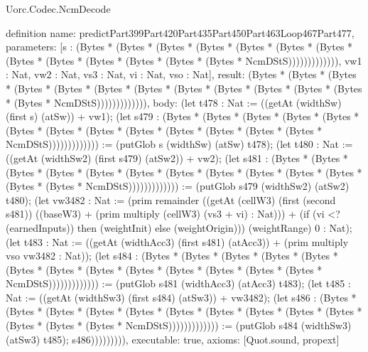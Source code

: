 \begin{lexlean}{Uorc.Codec.NcmDecode}
\begin{semanticmodule}
definition{
  name: predictPart399Part420Part435Part450Part463Loop467Part477,
  parameters: [s : (Bytes * (Bytes * (Bytes * (Bytes * (Bytes * (Bytes * (Bytes * (Bytes * (Bytes * (Bytes * (Bytes * (Bytes * (Bytes * NcmDStS))))))))))))), vw1 : Nat, vw2 : Nat, vs3 : Nat, vi : Nat, vso : Nat],
  result: (Bytes * (Bytes * (Bytes * (Bytes * (Bytes * (Bytes * (Bytes * (Bytes * (Bytes * (Bytes * (Bytes * (Bytes * (Bytes * NcmDStS))))))))))))),
  body: (let t478 : Nat := ((getAt (widthSw) (first s) (atSw)) + vw1); (let s479 : (Bytes * (Bytes * (Bytes * (Bytes * (Bytes * (Bytes * (Bytes * (Bytes * (Bytes * (Bytes * (Bytes * (Bytes * (Bytes * NcmDStS))))))))))))) := (putGlob s (widthSw) (atSw) t478); (let t480 : Nat := ((getAt (widthSw2) (first s479) (atSw2)) + vw2); (let s481 : (Bytes * (Bytes * (Bytes * (Bytes * (Bytes * (Bytes * (Bytes * (Bytes * (Bytes * (Bytes * (Bytes * (Bytes * (Bytes * NcmDStS))))))))))))) := (putGlob s479 (widthSw2) (atSw2) t480); (let vw3482 : Nat := (prim remainder ((getAt (cellW3) (first (second s481)) ((baseW3) + (prim multiply (cellW3) (vs3 + vi) : Nat))) + (if (vi <? (earnedInputs)) then (weightInit) else (weightOrigin))) (weightRange) 0 : Nat); (let t483 : Nat := ((getAt (widthAcc3) (first s481) (atAcc3)) + (prim multiply vso vw3482 : Nat)); (let s484 : (Bytes * (Bytes * (Bytes * (Bytes * (Bytes * (Bytes * (Bytes * (Bytes * (Bytes * (Bytes * (Bytes * (Bytes * (Bytes * NcmDStS))))))))))))) := (putGlob s481 (widthAcc3) (atAcc3) t483); (let t485 : Nat := ((getAt (widthSw3) (first s484) (atSw3)) + vw3482); (let s486 : (Bytes * (Bytes * (Bytes * (Bytes * (Bytes * (Bytes * (Bytes * (Bytes * (Bytes * (Bytes * (Bytes * (Bytes * (Bytes * NcmDStS))))))))))))) := (putGlob s484 (widthSw3) (atSw3) t485); s486))))))))),
  executable: true,
  axioms: [Quot.sound, propext]
}


\end{semanticmodule}
\end{lexlean}
